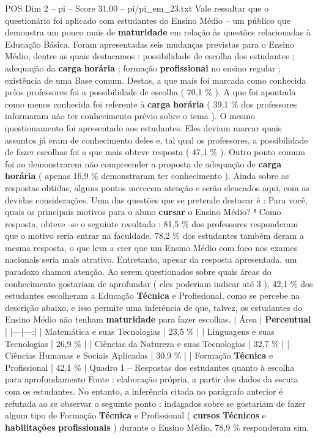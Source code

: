 \begin{textsample}{POS Dim 2 – pi – Score 31.00 – pi/pi\_em\_23.txt}
Vale ressaltar que o questionário foi aplicado com estudantes do Ensino Médio – um público que demonstra um pouco mais de \textbf{maturidade} em relação às questões relacionadas à Educação Básica.
Foram apresentadas seis mudanças previstas para o Ensino Médio, dentre as quais destacamos : possibilidade de escolha dos estudantes ; adequação da \textbf{carga} \textbf{horária} ; formação \textbf{profissional} no ensino regular ; existência de uma Base comum.
Destas, a que mais foi marcada como conhecida pelos professores foi a possibilidade de escolha ( 70,1 \% ).
A que foi apontada como menos conhecida foi referente à \textbf{carga} \textbf{horária} ( 39,1 \% dos professores informaram não ter conhecimento prévio sobre o tema ).
O mesmo questionamento foi apresentado aos estudantes.
Eles deviam marcar quais assuntos já eram de conhecimento deles e, tal qual os professores, a possibilidade de fazer escolhas foi a que mais obteve resposta ( 47,1 \% ).
Outro ponto comum foi ao demonstrarem não compreender a proposta de adequação de \textbf{carga} \textbf{horária} ( apenas 16,9 \% demonstraram ter conhecimento ).
Ainda sobre as respostas obtidas, alguns pontos merecem atenção e serão elencados aqui, com as devidas considerações.
Uma das questões que se pretende destacar é : Para você, quais os principais motivos para o aluno \textbf{cursar} o Ensino Médio? ⁸ Como resposta, obteve -se o seguinte resultado : 81,5 \% dos professores responderam que o motivo seria entrar na faculdade. 78,2 \% dos estudantes também deram a mesma resposta, o que leva a crer que um Ensino Médio com foco nos exames nacionais seria mais atrativo.
Entretanto, apesar da resposta apresentada, um paradoxo chamou atenção.
Ao serem questionados sobre quais áreas do conhecimento gostariam de aprofundar ( eles poderiam indicar até 3 ), 42,1 \% dos estudantes escolheram a Educação \textbf{Técnica} e Profissional, como se percebe na descrição abaixo, e isso permite uma inferência de que, talvez, os estudantes do Ensino Médio não tenham \textbf{maturidade} para fazer escolhas. | Área | \textbf{Percentual} | |---|---:| | Matemática e suas Tecnologias | 23,5 \% | | Linguagens e suas Tecnologias | 26,9 \% | | Ciências da Natureza e suas Tecnologias | 32,7 \% | | Ciências Humanas e Sociais Aplicadas | 30,9 \% | | Formação \textbf{Técnica} e Profissional | 42,1 \% | Quadro 1 – Respostas dos estudantes quanto à escolha para aprofundamento Fonte : elaboração própria, a partir dos dados da escuta com os estudantes.
No entanto, a inferência citada no parágrafo anterior é refutada ao se observar o seguinte ponto : indagados sobre se gostariam de fazer algum tipo de Formação \textbf{Técnica} e Profissional ( \textbf{cursos} \textbf{Técnicos} e \textbf{habilitações} \textbf{profissionais} ) durante o Ensino Médio, 78,9 \% responderam sim.

\end{textsample}
